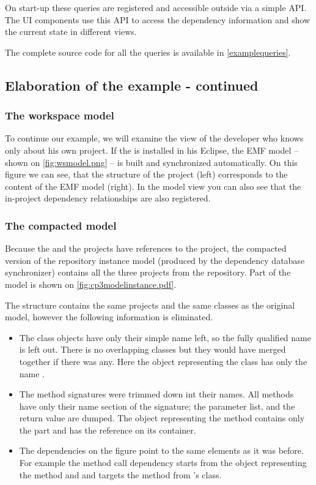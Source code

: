 On start-up these queries are registered and accessible outside via a simple API.
The UI components use this API to access the dependency information and show the
current state in different views.

The complete source code for all the queries is available in \autoref{examplequeries}.


\subsection{Elaboration of the example - continued}\label{sect:elabex2}
\subsubsection{The workspace model}
To continue our example, we will examine the view of the developer who knows
only about his own  project. If the \ptool{} is  installed in his
Eclipse, the EMF model -- shown on \autoref{fig:wsmodel.png}
-- is built and synchronized automatically. On this figure we can see, that the
structure of the project (left) corresponds to the content of the EMF model
(right). In the model view you can also see that the in-project dependency
relationships are also registered.


\subsubsection{The compacted model}
Because the  and the  projects have
references to the  project, the compacted version of the repository instance model (produced by the
dependency database synchronizer) contains all the three projects from the
repository. Part of the model is shown on
\autoref{fig:cp3modelinstance.pdf}.

The structure contains the same projects and the same
classes as the original model, however the following information is eliminated.
\begin{itemize}
  \item The class objects have only their simple name left, so the fully qualified name is left out.
There is no overlapping classes but they would have merged together if
there was any. Here the object representing the  class has only the name
.
  \item The method signatures were trimmed down int their names. All methods have only their 
name section of the signature; the parameter list, and the return value are dumped.    
The object representing the 
method contains only the  part and has the reference on
its container.
  \item The dependencies on the figure point to the same elements as it was
  before. For example the method call dependency starts from the object
  representing the   method
  and and targets the  method from 's
    class.
\end{itemize}


